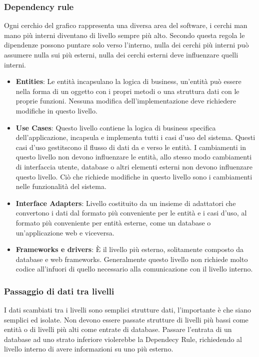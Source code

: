 \documentclass[a4paper]{article}
\begin{document}
\subsubsection{Dependency rule}
Ogni cerchio del grafico rappresenta una diversa area del software, i cerchi man mano più interni diventano di livello sempre più alto.
Secondo questa regola le dipendenze possono puntare solo verso l'interno, nulla dei cerchi più interni può assumere nulla sui più esterni, nulla dei cerchi esterni deve influenzare quelli interni.
\begin{itemize}
    \item{\textbf{Entities}}: Le entità incapsulano la logica di business, un'entità può essere nella forma di un oggetto con i propri metodi o una struttura dati con le proprie funzioni. Nessuna modifica dell'implementazione deve richiedere modifiche in questo livello.

    \item{\textbf{Use Cases}}: Questo livello contiene la logica di business specifica dell'applicazione, incapsula e implementa tutti i casi d'uso del sistema. Questi casi d'uso gestitscono il flusso di dati da e verso le entità. I cambiamenti in questo livello non devono influenzare le entità, allo stesso modo cambiamenti di interfaccia utente, database o altri elementi esterni non devono influenzare questo livello. Ciò che richiede modifiche in questo livello sono i cambiamenti nelle funzionalità del sistema.

    \item{\textbf{Interface Adapters}}: Livello costituito da un insieme di adattatori che convertono i dati dal formato più conveniente per le entità e i casi d'uso, al formato più conveniente per entità esterne, come un database o un'applicazione web e viceversa.

    \item{\textbf{Frameworks e drivers}}: È il livello più esterno, solitamente composto da database e web frameworks. Generalmente questo livello non richiede molto codice all'infuori di quello necessario alla comunicazione con il livello interno.\cite{clean_architecture}
\end{itemize}

\subsubsection{Passaggio di dati tra livelli}
I dati scambiati tra i livelli sono semplici strutture dati, l'importante è che siano semplici ed isolate. Non devono essere passate strutture di livelli più bassi come entità o di livelli più alti come entrate di database. Passare l'entrata di un database ad uno strato inferiore violerebbe la Dependecy Rule, richiedendo al livello interno di avere informazioni su uno più esterno.\cite{clean_architecture}
\end{document}
